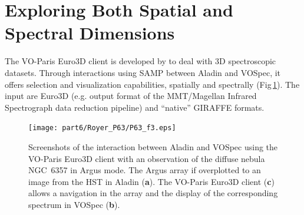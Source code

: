 \section{Exploring Both Spatial and Spectral Dimensions}
The VO-Paris Euro3D client is developed by \citet{Chn_08} to deal with 3D spectroscopic datasets. Through interactions using SAMP between Aladin  and VOSpec, it offers selection and visualization capabilities, spatially and spectrally (Fig\,\ref{aladin}). The input are Euro3D (e.g.  output format of the MMT/Magellan Infrared Spectrograph data reduction pipeline) and ``native'' GIRAFFE formats. 
\begin{figure}[!ht]
\begin{center}
    \texttt{[image: part6/Royer\_P63/P63\_f3.eps]}
\end{center}
\caption{Screenshots of the interaction between Aladin and VOSpec using the VO-Paris Euro3D client \citep{Chn_08} with an observation of the diffuse nebula NGC~6357 in Argus mode. The Argus array if overplotted to an image from the HST in Aladin (\textbf{a}). The VO-Paris Euro3D client (\textbf{c}) allows a navigation in the array and the display of the corresponding spectrum in VOSpec (\textbf{b}).}
\label{aladin}
\end{figure}





